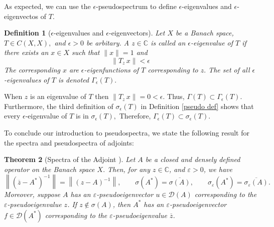 \documentclass[12pt,a4paper]{article}
\theoremstyle{boldthm}
\newtheorem{theorem}{Theorem}[section]
\theoremstyle{bolddefn}
\newtheorem{definition}[theorem]{Definition}
\begin{document}
As expected, we can use the $\epsilon$-pseudospectrum to define $\epsilon$-eigenvalues and $\epsilon$-eigenvectos of $T.$ 

\begin{definition}[$\epsilon$-eigenvalues and $\epsilon$-eigenvectors]
    Let $X$ be a Banach space, $T \in C(X, X),$ and $\epsilon > 0$ be arbitary.  
    A $z \in \mathbb{C}$ is called an $\epsilon$-eigenvalue of $T$ if there exists an $x \in X$ such that $\|x\| = 1$ and 
    \begin{equation}
       \|T_z \, x \| < \epsilon
    \end{equation}
    The corresponding $x$ are $\epsilon$-eigenfunctions of $T$ corresponding to $z.$ 
    The set of all $\epsilon$-eigenvalues of $T$ is denoted $\Gamma_{\epsilon}(T).$
\end{definition}

When $z$ is an eigenvalue of $T$ then $\|T_z \, x \| = 0 < \epsilon.$ Thus, $\Gamma(T) \subset \Gamma_{\epsilon}(T).$ Furthermore, the third definition of $\sigma_{\epsilon}(T)$ in Definition \ref{pseudo def} shows that every $\epsilon$-eigenvalue of $T$ is in $\sigma_{\epsilon}(T),$ Therefore, $\Gamma_{\epsilon}(T) \subset \sigma_{\epsilon}(T).$


To conclude our introduction to pseudospectra, we state the following result for the spectra and pseudospectra of adjoints:
\begin{theorem}[{Spectra of the Adjoint \cite[Theorem 4.4, page 581, respectively]{Nick, Matt}}]
    Let $A$ be a closed and densely defined operator on the Banach space $X.$  Then, for any \(z \in \mathbb C\), and \(\varepsilon > 0\), we have
\[
\left\|(\overline{z}-A^*)^{-1}\right\|
=
\left\|(z-A)^{-1}\right\|,
\qquad
\sigma(A^*)=\overline{\sigma(A)},
\qquad
\sigma_{\varepsilon}(A^*)=\overline{\sigma_{\varepsilon}(A)}.
\]
Moreover, suppose \(A\) has an \(\varepsilon\)-pseudoeigenvector
\(u\in\mathcal D(A)\) corresponding to the \(\varepsilon\)-pseudoeigenvalue \(z\).
If \(z\notin\sigma(A)\), then \(A^*\) has an \(\varepsilon\)-pseudoeigenvector
\(f\in\mathcal D(A^*)\) corresponding to the \(\varepsilon\)-pseudoeigenvalue
\(\overline{z}\).
\end{theorem}







\newpage


\end{document}
